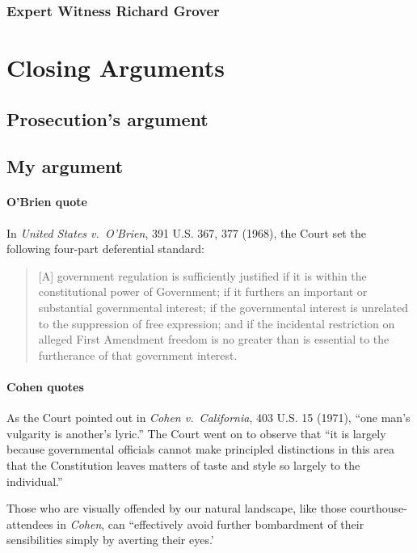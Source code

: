 \documentclass[12pt]{article}
\begin{document}
\subsubsection{Expert Witness Richard Grover}


\section{Closing Arguments}
\subsection{Prosecution's argument}

\subsection{My argument}

\paragraph{O'Brien quote}
In {\it United States v.\ O'Brien}, 391 U.S. 367, 377 (1968), the Court set the following four-part deferential standard:
\begin{quote}
[A] government regulation is sufficiently justified if it is within the constitutional power of Government; if it furthers an important or substantial governmental interest; if the governmental interest is unrelated to the suppression of free expression; and if the incidental restriction on alleged First Amendment freedom is no greater than is essential to the furtherance of that government interest.
\end{quote}


\paragraph{Cohen quotes}
As the Court pointed out in  {\em Cohen v.\ California}, 403 U.S. 15 (1971), ``one man's vulgarity is another's lyric.''
The Court went on to observe that ``it is largely because governmental officials cannot make principled distinctions in this area that the Constitution leaves matters of taste and style so largely to the individual.''

Those who are visually offended by our natural landscape, like those courthouse-attendees in {\em Cohen}, can ``effectively avoid further bombardment of their sensibilities simply by averting their eyes.'
\end{document}
